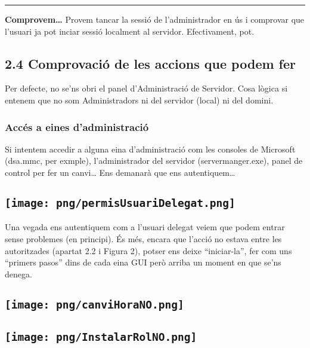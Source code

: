 \documentclass[
  a4paper,
]{article}
\begin{document}
\begin{center}\rule{0.5\linewidth}{0.5pt}\end{center}

\textbf{Comprovem\ldots{}} Provem tancar la sessió de l'administrador en
ús i comprovar que l'usuari ja pot inciar sessió localment al servidor.
Efectivament, pot.

\subsection{2.4 Comprovació de les accions que podem
fer}\label{comprovaciuxf3-de-les-accions-que-podem-fer}

Per defecte, no se'ns obri el panel d'Administració de Servidor. Cosa
lògica si entenem que no som Administradors ni del servidor (local) ni
del domini.

\subsubsection{Accés a eines
d'administració}\label{accuxe9s-a-eines-dadministraciuxf3}

Si intentem accedir a alguna eina d'administració com les consoles de
Microsoft (dsa.mmc, per exmple), l'administrador del servidor
(servermanger.exe), panel de control per fer un canvi\ldots{} Ens
demanarà que ens autentiquem\ldots{}

\subsection{\texorpdfstring{\protect\texttt{[image: png/permisUsuariDelegat.png]}}{Figura 8: Autenticació d'usuari}}\label{figura-8-autenticaciuxf3-dusuari}

Una vegada ens autentiquem com a l'usuari delegat veiem que podem entrar
sense problemes (en principi). És més, encara que l'acció no estava
entre les autoritzades (apartat 2.2 i Figura 2), potser ens deixe
``iniciar-la'', fer com uns ``primers pasos'' dins de cada eina GUI però
arriba un moment en que se'ns denega.

\subsection{\texorpdfstring{\protect\texttt{[image: png/canviHoraNO.png]}}{Figura 9: Panel de control, canviar hora}}\label{figura-9-panel-de-control-canviar-hora}

\subsection{\texorpdfstring{\protect\texttt{[image: png/InstalarRolNO.png]}}{Figura 10: Instal·lar ROL}}\label{figura-10-installar-rol}
\end{document}
